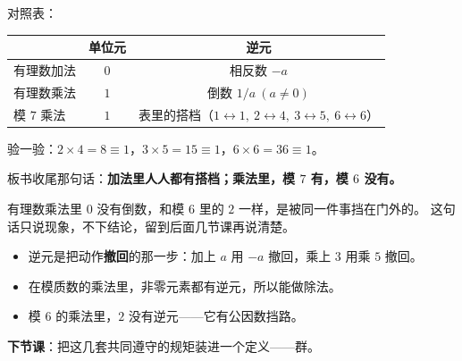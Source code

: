 对照表：

\begin{center}
\begin{tabular}{@{}lcc@{}}
  \toprule
   & \textbf{单位元} & \textbf{逆元} \\
  \midrule
  有理数加法 & \(0\) & 相反数 \(-a\) \\
  有理数乘法 & \(1\) & 倒数 \(1/a\ (a\neq0)\) \\
  模 \(7\) 乘法 & \(1\) & 表里的搭档（\(1\leftrightarrow1,\ 2\leftrightarrow4,\ 3\leftrightarrow5,\ 6\leftrightarrow6\)） \\
  \bottomrule
\end{tabular}
\end{center}

验一验：\(2\times4=8\equiv1\)，\(3\times5=15\equiv1\)，\(6\times6=36\equiv1\)。

板书收尾那句话：\textbf{加法里人人都有搭档；乘法里，模 \(7\) 有，模 \(6\) 没有。}

\begin{zhu}
  有理数乘法里 \(0\) 没有倒数，和模 \(6\) 里的 \(2\) 一样，是被同一件事挡在门外的。
  这句话只说现象，不下结论，留到后面几节课再说清楚。
\end{zhu}

\begin{xiaojie}
  \begin{itemize}
    \item 逆元是把动作\textbf{撤回}的那一步：加上 \(a\) 用 \(-a\) 撤回，乘上 \(3\) 用乘 \(5\) 撤回。
    \item 在模质数的乘法里，非零元素都有逆元，所以能做除法。
    \item 模 \(6\) 的乘法里，\(2\) 没有逆元——它有公因数挡路。
  \end{itemize}
\end{xiaojie}

\noindent\textbf{下节课}：把这几套共同遵守的规矩装进一个定义——群。